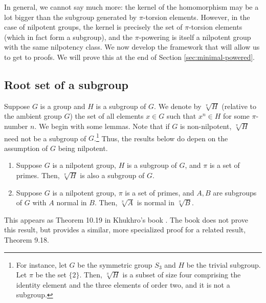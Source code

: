 \documentclass{ucetd}
\begin{document}
In general, we cannot say much more: the kernel of the homomorphism
may be a lot bigger than the subgroup generated by $\pi$-torsion
elements. However, in the case of nilpotent groups, the kernel is
precisely the set of $\pi$-torsion elements (which in fact form a
subgroup), and the $\pi$-powering is itself a nilpotent group with the
same nilpotency class. We now develop the framework that will allow us
to get to proofs. We will prove this at the end of Section
\ref{sec:minimal-powered}.

\subsection{Root set of a subgroup}\label{sec:root-set}

Suppose $G$ is a group and $H$ is a subgroup of $G$. We denote by
$\sqrt[\pi]{H}$ (relative to the ambient group $G$) the set of all
elements $x \in G$ such that $x^n \in H$ for some $\pi$-number $n$. We
begin with some lemmas. Note that if $G$ is non-nilpotent,
$\sqrt[\pi]{H}$ need not be a subgroup of $G$.\footnote{For instance,
  let $G$ be the symmetric group $S_3$ and $H$ be the trivial
  subgroup. Let $\pi$ be the set $\{ 2 \}$. Then, $\sqrt[\pi]{H}$ is a
  subset of size four comprising the identity element and the three
  elements of order two, and it is not a subgroup.} Thus, the results
below do depen on the assumption of $G$ being nilpotent.

\begin{theorem}\label{thm:nilpotent-pi-root-subgroup}
  \begin{enumerate}
  \item Suppose $G$ is a nilpotent group, $H$ is a subgroup of $G$,
    and $\pi$ is a set of primes. Then, $\sqrt[\pi]{H}$ is also a
    subgroup of $G$.
  \item Suppose $G$ is a nilpotent group, $\pi$ is a set of primes,
    and $A,B$ are subgroups of $G$ with $A$ normal in $B$. Then,
    $\sqrt[\pi]{A}$ is normal in $\sqrt[\pi]{B}$.
  \end{enumerate}
\end{theorem}

This appears as Theorem 10.19 in Khukhro's book \cite{Khukhro}. The
book does not prove this result, but provides a similar, more
specialized proof for a related result, Theorem 9.18.
\end{document}
